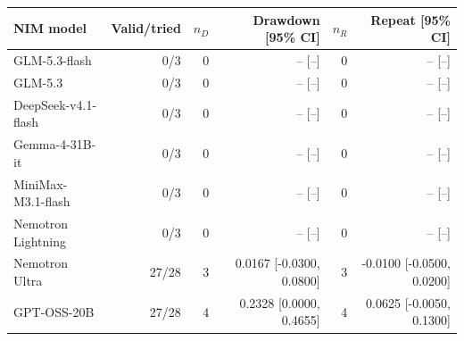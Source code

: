 \begin{tabular}{lrrrrr}
\toprule
NIM model & Valid/tried & $n_D$ & Drawdown [95\% CI] & $n_R$ & Repeat [95\% CI] \\
\midrule
GLM-5.3-flash & 0/3 & 0 & -- [--] & 0 & -- [--] \\
GLM-5.3 & 0/3 & 0 & -- [--] & 0 & -- [--] \\
DeepSeek-v4.1-flash & 0/3 & 0 & -- [--] & 0 & -- [--] \\
Gemma-4-31B-it & 0/3 & 0 & -- [--] & 0 & -- [--] \\
MiniMax-M3.1-flash & 0/3 & 0 & -- [--] & 0 & -- [--] \\
Nemotron Lightning & 0/3 & 0 & -- [--] & 0 & -- [--] \\
Nemotron Ultra & 27/28 & 3 & 0.0167 [-0.0300, 0.0800] & 3 & -0.0100 [-0.0500, 0.0200] \\
GPT-OSS-20B & 27/28 & 4 & 0.2328 [0.0000, 0.4655] & 4 & 0.0625 [-0.0050, 0.1300] \\
\bottomrule
\end{tabular}
